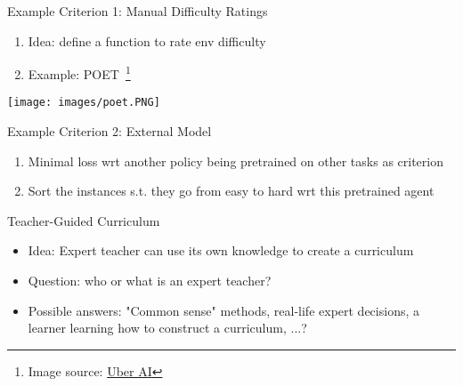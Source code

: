 \documentclass[aspectratio=169]{../latex_main/tntbeamer}  %
\begin{document}
\begin{frame}[c]{Example Criterion 1: Manual Difficulty Ratings}
	
	\begin{enumerate}
		\item Idea: define a function to rate env difficulty
		\item Example: POET~\footnote{Image source: \href{https://eng.uber.com/poet-open-ended-deep-learning/}{Uber AI}}
	\end{enumerate}
	\centering
	
	\texttt{[image: images/poet.PNG]}			
\end{frame}

\begin{frame}[c]{Example Criterion 2: External Model}
	
	\begin{enumerate}
		\item Minimal loss wrt another policy being pretrained on other tasks as criterion
		\item Sort the instances s.t. they go from easy to hard wrt this pretrained agent~
	\end{enumerate}
	
\end{frame}

\begin{frame}[c]{Teacher-Guided Curriculum}
	
	\begin{itemize}
		\item Idea: Expert teacher can use its own knowledge to create a curriculum
		\item Question: who or what is an expert teacher?
		\pause
		\item Possible answers: "Common sense" methods, real-life expert decisions, a learner learning how to construct a curriculum, ...?
	\end{itemize}
	
\end{frame}
\end{document}
